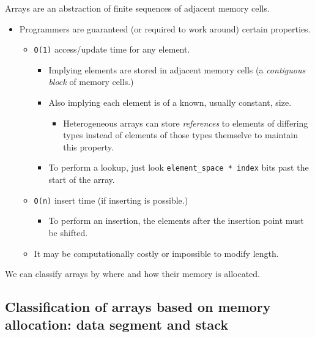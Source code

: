 \documentclass[11pt]{article}
\theoremstyle{definition}
\begin{document}
Arrays are an abstraction of finite sequences of
adjacent memory cells.
\begin{itemize}
\item Programmers are guaranteed (or required to work around) certain properties.
\begin{itemize}
\item \texttt{O(1)} access/update time for any element.
\begin{itemize}
\item Implying elements are stored in adjacent memory cells
(a \emph{contiguous block} of memory cells.)
\item Also implying each element is of a known, usually constant, size.
\begin{itemize}
\item Heterogeneous arrays can store \emph{references} to elements of differing types
instead of elements of those types themselve to maintain this property.
\end{itemize}
\item To perform a lookup, just look \texttt{element\_space * index} bits
past the start of the array.
\end{itemize}
\item \texttt{O(n)} insert time (if inserting is possible.)
\begin{itemize}
\item To perform an insertion, the elements after the insertion point
must be shifted.
\end{itemize}
\item It may be computationally costly or impossible to modify length.
\end{itemize}
\end{itemize}

We can classify arrays by where and how their memory is allocated.

\subsection{Classification of arrays based on memory allocation: data segment and stack}
\label{sec:orgcfd9a77}
\end{document}
